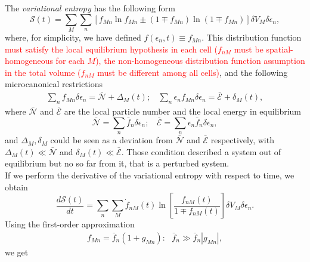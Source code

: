 \documentclass{article}
\newcommand{\de}{\delta}
\newcommand{\Ss}{\mathcal{S}}
\begin{document}
The \textit{variational entropy} has the following form
\begin{equation}
    \Ss(t)=\sum_{M} \sum_{n} \left[ f_{Mn} \ln f_{Mn} \pm (1 \mp f_{Mn}) \ln (1 \mp f_{Mn}) \right] \de V_M \delta \epsilon_n \label{entropy2},
\end{equation}
where, for simplicity, we have defined $f(\epsilon_{n},t)\equiv f_{Mn}$.
This distribution function \textcolor{red}{must satisfy the local equilibrium hypothesis in each cell ($f_{nM}$ must be spatial-homogeneous for each $M$), the non-homogeneous distribution function assumption in the total volume ($f_{nM}$ must be different among all cells)}, and the following microcanonical restrictions
\begin{eqnarray}
        \sum_{n}f_{Mn} \delta \epsilon_n=\bar{\mathcal{N}}+\Delta_M(t); \ \ \ \ \sum_{n}\epsilon_{n}f_{Mn} \delta \epsilon_n=\bar{\mathcal{E}}+ \delta_M(t), \label{restrictionoutside}
  \end{eqnarray}
  where $\bar {\mathcal{N}}$ and $\bar{\mathcal{E}}$ are the local particle number and the local energy in equilibrium
  \begin{equation}
      \bar{\mathcal{N}}= \sum_n \bar{f}_n \delta \epsilon_n; \ \ \ \ \bar{\mathcal{E}}= \sum_n \epsilon_n\bar{f}_n \delta \epsilon_n,
  \end{equation}
  and $\Delta_M,\delta_M$ could be seen as a deviation from $\bar{\mathcal{N}}$ and $\bar{\mathcal{E}}$ respectively, with $\Delta_M(t)\ll \bar{\mathcal{N}}$ and $\delta_M(t) \ll \bar{\mathcal{E}}$. Those condition described a system out of equilibrium but no so far from it, that is a perturbed system.  \\
If we perform the derivative of the variational entropy with respect to time, we obtain
\begin{equation}
   \frac{d \Ss (t)}{dt}= \sum_n \sum_M \dot{f}_{nM}(t)\ln \left[ \frac{f_{nM}(t)}{1\mp f_{nM}(t)} \right] \de V_M \delta \epsilon_n.\label{deltaH}
\end{equation}{}
Using the first-order approximation
\begin{eqnarray}
   f_{Mn}=\bar{f}_{n}(1+g_{Mn}): \ \ \ \bar{f}_{n}\gg \bar{f}_{n}|g_{Mn}|, \label{firstorder}
\end{eqnarray}{}
we get 
\end{document}
